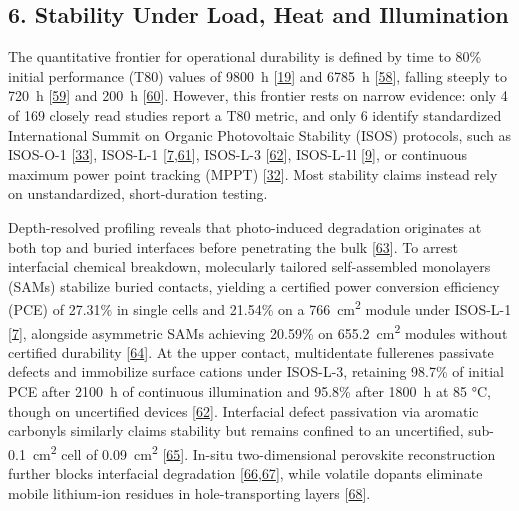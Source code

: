\documentclass[
  11pt,
]{article}
\begin{document}
\subsection{6. Stability Under Load, Heat and
Illumination}\label{stability-under-load-heat-and-illumination}

The quantitative frontier for operational durability is defined by time
to 80\% initial performance (T80) values of \qty{9800}{\hour}
{[}\href{https://doi.org/10.1002/adma.74243}{19}{]} and
\qty{6785}{\hour} {[}\href{https://doi.org/10.1002/aenm.71317}{58}{]},
falling steeply to \qty{720}{\hour}
{[}\href{https://doi.org/10.1021/acsaem.6c01637}{59}{]} and
\qty{200}{\hour} {[}\href{https://doi.org/10.1002/smll.74531}{60}{]}.
However, this frontier rests on narrow evidence: only 4 of 169 closely
read studies report a T80 metric, and only 6 identify standardized
International Summit on Organic Photovoltaic Stability (ISOS) protocols,
such as ISOS-O-1
{[}\href{https://doi.org/10.1126/sciadv.aee4175}{33}{]}, ISOS-L-1
{[}\href{https://doi.org/10.1126/sciadv.aeg1456}{7},\href{https://doi.org/10.1021/acsnano.6c04084}{61}{]},
ISOS-L-3 {[}\href{https://doi.org/10.1021/acsenergylett.6c01517}{62}{]},
ISOS-L-1l {[}\href{https://doi.org/10.1021/jacs.6c06932}{9}{]}, or
continuous maximum power point tracking (MPPT)
{[}\href{https://doi.org/10.26599/pom.2026.9140147}{32}{]}. Most
stability claims instead rely on unstandardized, short-duration testing.

Depth-resolved profiling reveals that photo-induced degradation
originates at both top and buried interfaces before penetrating the bulk
{[}\href{https://doi.org/10.1002/solr.70421}{63}{]}. To arrest
interfacial chemical breakdown, molecularly tailored self-assembled
monolayers (SAMs) stabilize buried contacts, yielding a certified power
conversion efficiency (PCE) of 27.31\% in single cells and 21.54\% on a
\qty{766}{\centi\meter\squared} module under ISOS-L-1
{[}\href{https://doi.org/10.1126/sciadv.aeg1456}{7}{]}, alongside
asymmetric SAMs achieving 20.59\% on \qty{655.2}{\centi\meter\squared}
modules without certified durability
{[}\href{https://doi.org/10.1002/anie.1678852}{64}{]}. At the upper
contact, multidentate fullerenes passivate defects and immobilize
surface cations under ISOS-L-3, retaining 98.7\% of initial PCE after
\qty{2100}{\hour} of continuous illumination and 95.8\% after
\qty{1800}{\hour} at 85 °C, though on uncertified devices
{[}\href{https://doi.org/10.1021/acsenergylett.6c01517}{62}{]}.
Interfacial defect passivation via aromatic carbonyls similarly claims
stability but remains confined to an uncertified,
sub-\qty{0.1}{\centi\meter\squared} cell of
\qty{0.09}{\centi\meter\squared}
{[}\href{https://doi.org/10.1002/anie.5216345}{65}{]}. In-situ
two-dimensional perovskite reconstruction further blocks interfacial
degradation
{[}\href{https://doi.org/10.1002/adma.74247}{66},\href{https://doi.org/10.1002/solr.70447}{67}{]},
while volatile dopants eliminate mobile lithium-ion residues in
hole-transporting layers
{[}\href{https://doi.org/10.1002/smll.74289}{68}{]}.
\end{document}
